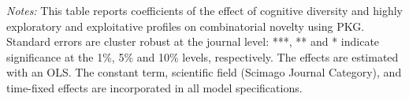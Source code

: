 \begin{table}[h!]
{\begin{threeparttable}
\begin{tabular}{@{\extracolsep{8pt}}lD{.}{.}{-3} D{.}{.}{-3} D{.}{.}{-3} D{.}{.}{-3} }
\end{tabular} 

\begin{tablenotes}
 \footnotesize
 \justifying \item {\it Notes:}
 This table reports coefficients of the effect of cognitive diversity and highly exploratory and exploitative profiles on combinatorial novelty using PKG. Standard errors are cluster robust at the journal level: ***, ** and * indicate significance at the 1\%, 5\% and 10\% levels, respectively. The effects are estimated with an OLS. The constant term, scientific field (Scimago Journal Category), and time-fixed effects are incorporated in all model specifications.
 \end{tablenotes}
 \end{threeparttable}
 }
\end{table} 